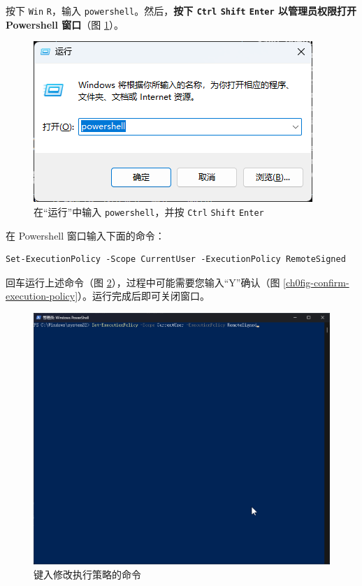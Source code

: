 按下 \lstinline{Win} \lstinline{R}，输入 \lstinline{powershell}。然后，\textbf{\color{red}按下 \lstinline{Ctrl} \lstinline{Shift} \lstinline{Enter} 以管理员权限打开 Powershell 窗口}（图 \ref{ch0fig-run-pwsh-as-admin}）。

\begin{figure}[H]
    \Centering
    \includegraphics[width=\textwidth]{docs/assets/intro/run_pwsh_as_admin.png}
    \caption{在“运行”中输入 \lstinline{powershell}，并按 \lstinline{Ctrl} \lstinline{Shift} \lstinline{Enter}}
    \label{ch0fig-run-pwsh-as-admin}
\end{figure}

在 Powershell 窗口输入下面的命令：

\begin{verbatim}
Set-ExecutionPolicy -Scope CurrentUser -ExecutionPolicy RemoteSigned
\end{verbatim}

回车运行上述命令（图 \ref{ch0fig-change-execution-policy}），过程中可能需要您输入“Y”确认（图 \ref{ch0fig-confirm-execution-policy}）。运行完成后即可关闭窗口。

\begin{figure}[H]
    \Centering
    \includegraphics[width=\textwidth]{docs/assets/intro/confirm_execution_policy_00.png}
    \caption{键入修改执行策略的命令}
    \label{ch0fig-change-execution-policy}
\end{figure}

